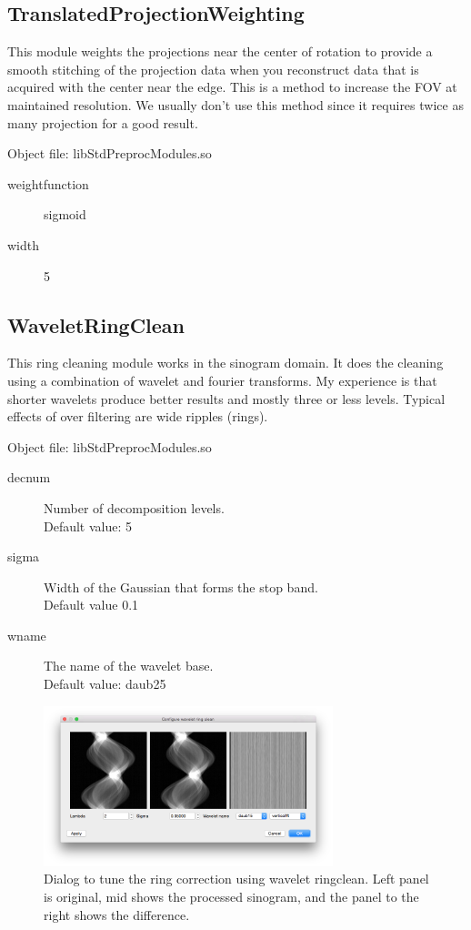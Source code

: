 \documentclass[a4paper]{scrreprt}
\begin{document}
\subsection{TranslatedProjectionWeighting}
This module weights the projections near the center of rotation to provide a smooth stitching of the projection data when you reconstruct data that is acquired with the center near the edge. This is a method to increase the FOV at maintained resolution. We usually don't use this method since it requires twice as many projection for a good result. 

Object file: libStdPreprocModules.so
\begin{description}
 \item[weightfunction] sigmoid
 \item[width] 5
\end{description}

\subsection{WaveletRingClean}
This ring cleaning module works in the sinogram domain. It does the cleaning using a combination of wavelet and fourier transforms\cite{muench2009_stripefilter}. My experience is that shorter wavelets produce better results and mostly three or less levels. Typical effects of over filtering are wide ripples (rings).

\noindent Object file: libStdPreprocModules.so
\begin{description}
 \item[decnum] Number of decomposition levels. \\Default value: 5
 \item[sigma] Width of the Gaussian that forms the stop band. \\ Default value 0.1
 \item[wname]The name of the wavelet base. \\Default value: daub25
\end{description}
\begin{figure}[ht!]
\centering
\includegraphics[width=0.75\textwidth]{figures3/WaveletRingCleanDlg.png}
\caption{Dialog to tune the ring correction using wavelet ringclean. Left panel is original, mid shows the processed sinogram, and the panel to the right shows the difference.}
\end{figure}
\end{document}
